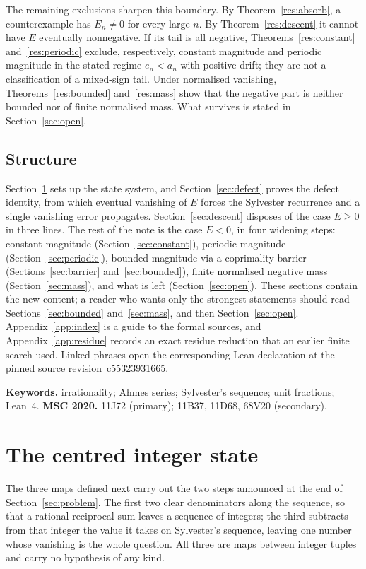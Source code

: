 \documentclass[11pt]{article}
\renewcommand{\commitshort}{c55323931665}
\begin{document}
\noindent The remaining exclusions sharpen this boundary.  By
Theorem~\ref{res:absorb}, a counterexample has $E_n\ne0$ for
every large $n$.  By Theorem~\ref{res:descent} it cannot have $E$ eventually
nonnegative.  If its tail is all negative, Theorems~\ref{res:constant}
and~\ref{res:periodic} exclude, respectively, constant magnitude and periodic
magnitude in the stated regime $e_n<a_n$ with positive drift; they are not a
classification of a mixed-sign tail.  Under normalised vanishing,
Theorems~\ref{res:bounded} and~\ref{res:mass} show that the negative part is
neither bounded nor of finite normalised mass.  What survives is stated in
Section~\ref{sec:open}.

\subsection*{Structure}

Section~\ref{sec:state} sets up the state system, and Section~\ref{sec:defect}
proves the defect identity, from which eventual vanishing of $E$ forces the
Sylvester recurrence and a single vanishing error propagates.
Section~\ref{sec:descent} disposes of the case $E\ge0$ in three lines.  The
rest of the note is the case $E<0$, in four widening steps: constant magnitude
(Section~\ref{sec:constant}), periodic magnitude
(Section~\ref{sec:periodic}), bounded magnitude via a coprimality barrier
(Sections~\ref{sec:barrier} and~\ref{sec:bounded}), finite normalised negative
mass (Section~\ref{sec:mass}), and what is left (Section~\ref{sec:open}).
These sections contain the new content; a reader who wants only the strongest
statements should read Sections~\ref{sec:bounded} and~\ref{sec:mass}, and then
Section~\ref{sec:open}.  Appendix~\ref{app:index} is a guide to the formal
sources, and Appendix~\ref{app:residue} records an exact residue reduction that
an earlier finite search used.  Linked phrases open the corresponding Lean
declaration at the pinned source revision~\commitshort.

\medskip
\noindent\textbf{Keywords.} irrationality; Ahmes series; Sylvester's sequence;
unit fractions; Lean~4.
\qquad
\textbf{MSC 2020.} 11J72 (primary); 11B37, 11D68, 68V20 (secondary).

\section{The centred integer state}\label{sec:state}

The three maps defined next carry out the two steps announced at the end of
Section~\ref{sec:problem}.  The first two clear denominators along the
sequence, so that a rational reciprocal sum leaves a sequence of integers; the
third subtracts from that integer the value it takes on Sylvester's sequence,
leaving one number whose vanishing is the whole question.  All three are maps
between integer tuples and carry no hypothesis of any kind.
\end{document}
